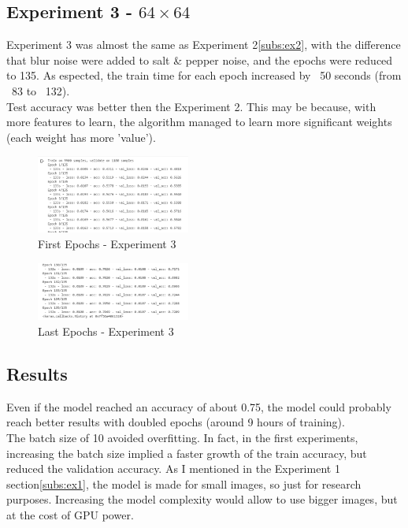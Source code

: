\documentclass[twocolumn,showpacs,%
  nofootinbib,aps,superscriptaddress,%
  eqsecnum,prd,notitlepage,showkeys,10pt]{revtex4-1}
\begin{document}
\subsection{Experiment 3 - $64\times64$}
Experiment 3 was almost the same as Experiment 2\ref{subs:ex2}, with the difference that blur noise were added to salt \& pepper noise, and the epochs were reduced to 135. As espected, the train time for each epoch increased by ~50 seconds (from ~83 to ~132).\\
Test accuracy was better then the Experiment 2. This may be because, with more features to learn, the algorithm managed to learn more significant weights (each weight has more 'value').

\begin{figure}[H]
    \includegraphics[width=0.45\textwidth]{images/fullnoise_fit_1.PNG}
    \caption{\label{fig:noise}First Epochs - Experiment 3}
\end{figure}
\begin{figure}[H]
    \includegraphics[width=0.45\textwidth]{images/fullnoise_fit_2.PNG}
    \caption{\label{fig:noise}Last Epochs - Experiment 3}
\end{figure}


\subsection{Results}
Even if the model reached an accuracy of about 0.75, the model could probably reach better results with doubled epochs (around 9 hours of training).\\
The batch size of 10 avoided overfitting. In fact, in the first experiments, increasing the batch size implied a faster growth of the train accuracy, but reduced the validation accuracy.
As I mentioned in the Experiment 1 section\ref{subs:ex1}, the model is made for small images, so just for research purposes. Increasing the model complexity would allow to use bigger images, but at the cost of GPU power.\\
\end{document}
